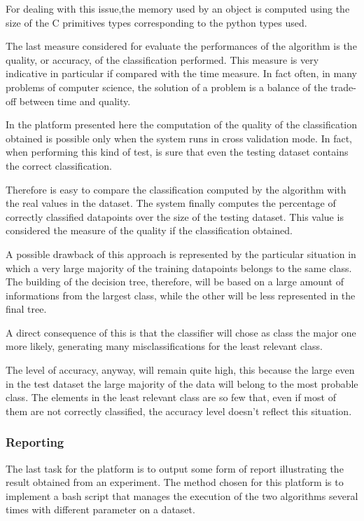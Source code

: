 \documentclass{acm_proc_article-sp-sigmod07}
\begin{document}
For dealing with this issue,the memory used by an object is computed using
the size of the C primitives types corresponding to the python types used.

The last measure considered for evaluate the performances of the
algorithm is the quality, or accuracy, of the classification performed. 
This measure is very indicative in particular if compared with the time
measure.
In fact often, in many problems of computer science, the solution of a
problem is a balance of the trade-off between time and quality.

In the platform presented here the computation of the quality of the
classification obtained is possible only when the system runs in cross
validation mode. In fact, when performing this kind of test, is sure that
even the testing dataset contains the correct classification.

Therefore is easy to compare the classification computed by the algorithm
with the real values in the dataset.
The system finally computes the percentage of correctly classified
datapoints over the size of the testing dataset.
This value is considered the measure of the quality if the classification
obtained.

A possible drawback of this approach is represented by the particular
situation in which a very large majority of the training datapoints
belongs to the same class.
The building of the decision tree, therefore, will be based on a large
amount of informations from the largest class, while the other will be
less represented in the final tree.

A direct consequence of this is that the classifier will chose as class
the major one more likely, generating many misclassifications for the
least relevant class.

The level of accuracy, anyway, will remain quite high, this because the
large even in the test dataset the large majority of the data will belong
to the most probable class. The elements in the least relevant class are
so few that, even if most of them are not correctly classified, the
accuracy level doesn't reflect this situation.

\subsubsection{Reporting}
The last task for the platform is to output some form of report
illustrating the result obtained from an experiment.
The method chosen for this platform is to implement a bash script that
manages the execution of the two algorithms several times with different
parameter on a dataset.
\end{document}
